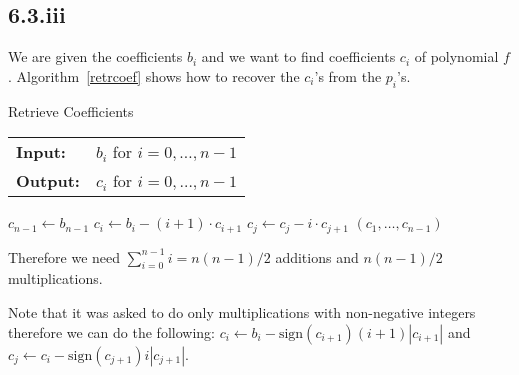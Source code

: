 \documentclass[12pt,a4paper]{article}
\newcommand {\sign}{\mathrm{sign}}
\begin{document}
\subsection*{6.3.iii}
We are given the coefficients $b_i$ and we want to find coefficients $c_i$ of polynomial $f$.
Algorithm~\ref{retrcoef} shows how to recover the $c_i$'s from the $p_i$'s.
\begin{algorithm}
    \caption{Retrieve Coefficients}\label{retrcoef}
    \begin{tabular}{l l}
        \textbf{Input:} & $b_i$ for $i=0,\dots,n-1$\\
        \textbf{Output:} & $c_i$ for $i=0,\dots,n-1$\\
    \end{tabular}
    \begin{algorithmic}[1]
            \State $c_{n-1} \gets b_{n-1}$
                \State $c_i \gets b_i - (i+1) \cdot c_{i+1}$
                    \State $c_j \gets c_j - i\cdot c_{j+1}$
                \EndFor
            \EndFor
            \State \Return $(c_1,\dots,c_{n-1})$
        \EndFunction
    \end{algorithmic}
\end{algorithm}

Therefore we need $\sum_{i=0}^{n-1}i = n(n-1)/2$ additions and  $n(n-1)/2$ multiplications.

Note that it was asked to do only multiplications with non-negative integers therefore we can do the following:
$c_i \leftarrow b_i - \sign(c_{i+1})(i+1)|c_{i+1}|$ and $c_j \leftarrow c_i - \sign(c_{j+1})i |c_{j+1}|$.
\end{document}
